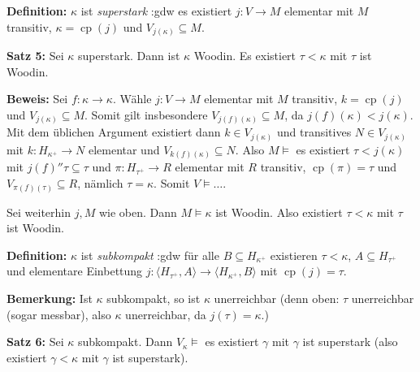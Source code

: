 \documentclass[a4paper,fontsize=11pt]{scrartcl}
\newcommand{\cp}{\operatorname{cp}}
\begin{document}
{\bf Definition:} $\kappa$ ist {\em superstark} :gdw es existiert $j\colon V\to M$ elementar mit $M$ transitiv, $\kappa=\cp(j)$ und $V_{j(\kappa)}\subseteq M$.

{\bf Satz 5:} Sei $\kappa$ superstark.
	Dann ist $\kappa$ Woodin.
	Es existiert $\tau<\kappa$ mit $\tau$ ist Woodin.

	{\bf Beweis:} Sei $f\colon \kappa\to\kappa$.
		Wähle $j\colon V\to M$ elementar mit $M$ transitiv, $k=\cp(j)$ und $V_{j(\kappa)}\subseteq M$.
		Somit gilt insbesondere $V_{j(f)(\kappa)}\subseteq M$, da $j(f)(\kappa)<j(\kappa)$.
		Mit dem üblichen Argument existiert dann $k\in V_{j(\kappa)}$ und transitives $N\in V_{j(\kappa)}$ mit $k\colon H_{\kappa^+}\to N$ elementar und $V_{k(f)(\kappa)}\subseteq N$.
		Also $M\models$ es existiert $\tau< j(\kappa)$ mit $j(f)''\tau\subseteq\tau$ und $\pi\colon H_{\tau^+}\to R$ elementar mit $R$ transitiv, 
		$\cp(\pi)=\tau$ und $V_{\pi(f)(\tau)}\subseteq R$, nämlich $\tau=\kappa$.
		Somit $V\models\ldots$.

Sei weiterhin $j,M$ wie oben. Dann $M\models\kappa$ ist Woodin. Also existiert $\tau<\kappa$ mit $\tau$ ist Woodin.

{\bf Definition:} $\kappa$ ist {\em subkompakt} :gdw für alle $B\subseteq H_{\kappa^+}$ existieren $\tau<\kappa$, $A\subseteq H_{\tau^+}$ und elementare Einbettung $j\colon\langle H_{\tau^+}, A\rangle\to\langle H_{\kappa^+}, B\rangle$ mit $\cp(j)=\tau$.

{\bf Bemerkung:}	Ist $\kappa$ subkompakt, so ist $\kappa$ unerreichbar 
	(denn oben: $\tau$ unerreichbar (sogar messbar), also $\kappa$ unerreichbar, da $j(\tau)=\kappa$.)

{\bf Satz 6:} Sei $\kappa$ subkompakt.
	Dann $V_{\kappa}\models$ es existiert $\gamma$ mit $\gamma$ ist superstark
	(also existiert $\gamma<\kappa$ mit $\gamma$ ist superstark).
\end{document}
